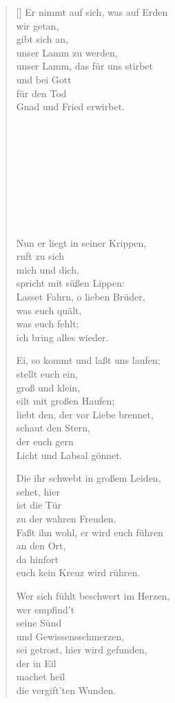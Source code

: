 \begin{multicols}{2}
\begin{verse}[\versewidth]
 Er nimmt auf sich, was auf Erden\\
wir getan,\\
gibt sich an,\\
unser Lamm zu werden,\\
unser Lamm, das für uns stirbet\\
und bei Gott\\
für den Tod\\
Gnad und Fried erwirbet.

\begin{verbatim}










\end{verbatim}

 Nun er liegt in seiner Krippen,\\
ruft zu sich\\
mich und dich,\\
spricht mit süßen Lippen:\\
Lasset Fahrn, o lieben Brüder,\\
was euch quält,\\
was euch fehlt;\\
ich bring alles wieder.
 
 Ei, so kommt und laßt uns laufen;\\
stellt euch ein,\\
groß und klein,\\
eilt mit großen Haufen;\\
liebt den, der vor Liebe brennet,\\
schaut den Stern,\\
der euch gern\\
Licht und Labsal gönnet.
 
 Die ihr schwebt in großem Leiden,\\
sehet, hier\\
ist die Tür\\
zu der wahren Freuden.\\
Faßt ihn wohl, er wird euch führen\\
an den Ort,\\
da hinfort\\
euch kein Kreuz wird rühren.
 
 Wer sich fühlt beschwert im Herzen,\\
wer empfind't\\
seine Sünd\\
und Gewissensschmerzen,\\
sei getrost, hier wird gefunden,\\
der in Eil\\
machet heil\\
die vergift'ten Wunden.
 

\end{verse}
\end{multicols}

